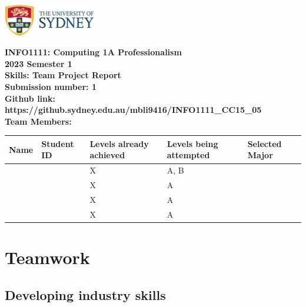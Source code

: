 \documentclass[a4paper, 11pt]{report}
\begin{document}
\begin{titlepage}
\begin{flushright}
\includegraphics[width=4cm]{USyd}\\[2cm]
\end{flushright}
\center 
\textbf{\huge INFO1111: Computing 1A Professionalism}\\[0.75cm]
\textbf{\huge 2023 Semester 1}\\[2cm]
\textbf{\huge Skills: Team Project Report}\\[3cm]

\textbf{\huge Submission number: 1}\\[0.75cm]
\textbf{Github link: https://github.sydney.edu.au/mbli9416/INFO1111\_CC15\_05}\\[0.75cm]
\textbf{\huge Team Members:}\\[0.75cm]

\begin{tabular}{|p{}|p{}|p{}|p{}|p{}|}
	\hline
	Name & Student ID & \raggedright{Levels already achieved} & \raggedright{Levels being attempted} & Selected Major \\
	\hline
	\hline
	\raggedright{\studA} & \sidA & X & A, B & \majA \\
	\raggedright{\studB} & \sidB & X & A & \majB \\
	\raggedright{\studC} & \sidC & X & A & \majC \\
	\raggedright{\studD} & \sidD & X & A & \majD \\
	\hline
\end{tabular}
\thispagestyle{empty}
\end{titlepage}



\tableofcontents



\newpage
\section{Teamwork}
\label{sect-team}


\subsection{Developing industry skills}
\end{document}
